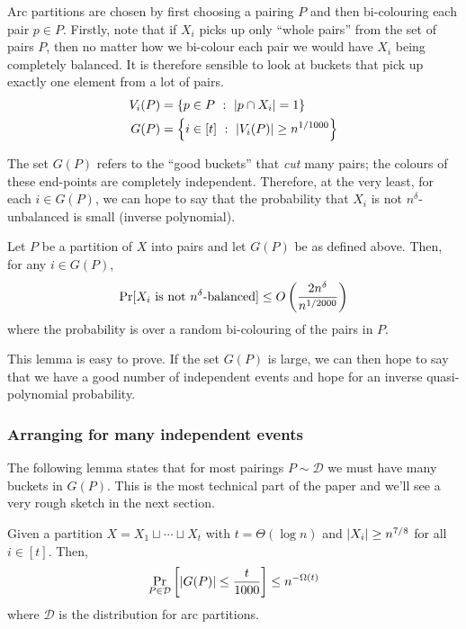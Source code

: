 Arc partitions are chosen by first choosing a pairing $P$ and then bi-colouring each pair $p \in P$. Firstly, note that if $X_i$ picks up only ``whole pairs'' from the set of pairs $P$, then no matter how we bi-colour each pair we would have $X_i$ being completely balanced. It is therefore sensible to look at buckets that pick up exactly one element from a lot of pairs. 
\begin{align*}
	 V_i(P) &= \left\{{ p \in P}\ : \ {\left| p \cap X_i \right| = 1 }\right\}\\
	G(P) &= \left\{{ i \in [t]}\ : \ {\left| V_i(P) \right| \geq n^{1/1000} }\right\}
\end{align*}

The set $G(P)$ refers to the ``good buckets'' that \emph{cut} many pairs; the colours of these end-points are completely independent. Therefore, at the very least, for each $i \in G(P)$, we can hope to say that the probability that $X_i$ is not $n^{\delta}$-unbalanced is small (inverse polynomial).

\begin{lemma}
  \label{lem:MLSep:bound-for-good-buckets}
  Let $P$ be a partition of $X$ into pairs and let $G(P)$ be as defined above. 
  Then, for any $i \in G(P)$,
  \[
    \Pr[ \text{$X_i$ is not $n^{\delta}$-balanced} ] \leq O\left(\frac{2n^{\delta}}{n^{1/2000}}\right)
  \]
  where the probability is over a random bi-colouring of the pairs in $P$. 
\end{lemma}

This lemma is easy to prove. If the set $G(P)$ is large, we can then hope to say that we have a good number of independent events and hope for an inverse quasi-polynomial probability. 

\subsubsection*{Arranging for many independent events}

The following lemma states that for most pairings $P \sim \mathcal{D}$ we must have many buckets in $G(P)$. This is the most technical part of the paper and we'll see a very rough sketch in the next section. 

\begin{lemma}
\label{lem:manyBucketsWithCuts}
Given a partition $X = X_1 \sqcup \cdots \sqcup X_t$ with $t = \Theta(\log n)$ and $\left|X_i\right| \geq n^{7/8}$ for all $i \in [t]$. Then,
\[
 \Pr_{P \in \mathcal{D}} \left[ \left|G(P)\right| \leq \frac{t}{1000} \right] \leq n^{- \Omega(t)}
\]
where $\mathcal{D}$ is the distribution for arc partitions.
\end{lemma}

